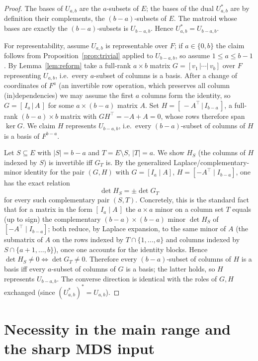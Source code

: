\documentclass{amsart}
\theoremstyle{definition}
\begin{document}
\begin{proof}
The bases of $U_{a,b}$ are the $a$-subsets of $E$; the bases of the dual
$U_{a,b}^{*}$ are by definition their complements, the $(b-a)$-subsets of $E$.
The matroid whose bases are exactly the $(b-a)$-subsets is $U_{b-a,b}$. Hence
$U_{a,b}^{*}=U_{b-a,b}$.

For representability, assume $U_{a,b}$ is representable over $F$; if $a\in\{0,b\}$
the claim follows from Proposition~\ref{prop:trivial} applied to $U_{b-a,b}$, so
assume $1\le a\le b-1$. By Lemma~\ref{lem:reform} take a full-rank $a\times b$
matrix $G=[v_1\,|\cdots|\,v_b]$ over $F$ representing $U_{a,b}$, i.e.\ every
$a$-subset of columns is a basis. After a change of coordinates of $F^a$
(an invertible row operation, which preserves all column (in)dependencies) we may
assume the first $a$ columns form the identity, so $G=[\,I_a\,|\,A\,]$ for some
$a\times(b-a)$ matrix $A$. Set $H=[\,-A^{\top}\,|\,I_{b-a}\,]$, a full-rank
$(b-a)\times b$ matrix with $GH^{\top}=-A+A=0$, whose rows therefore span
$\ker G$. We claim $H$ represents $U_{b-a,b}$, i.e.\ every $(b-a)$-subset of
columns of $H$ is a basis of $F^{b-a}$.

Let $S\subseteq E$ with $|S|=b-a$ and $T=E\setminus S$, $|T|=a$. We show
$H_S$ (the columns of $H$ indexed by $S$) is invertible iff $G_T$ is. By the
generalized Laplace/complementary-minor identity for the pair $(G,H)$ with
$G=[I_a\mid A]$, $H=[-A^\top\mid I_{b-a}]$, one has the exact relation
\[
\det H_S=\pm\det G_T
\]
for every such complementary pair $(S,T)$. Concretely, this is the standard fact
that for a matrix in the form $[\,I_a\mid A\,]$ the $a\times a$ minor on a column
set $T$ equals (up to sign) the complementary $(b-a)\times(b-a)$ minor
$\det H_S$ of $[-A^\top\mid I_{b-a}]$; both reduce, by Laplace expansion, to the
same minor of $A$ (the submatrix of $A$ on the rows indexed by $T\cap\{1,\dots,a\}$
and columns indexed by $S\cap\{a+1,\dots,b\}$), once one accounts for the identity
blocks. Hence $\det H_S\ne0\iff\det G_T\ne0$. Therefore every $(b-a)$-subset of
columns of $H$ is a basis iff every $a$-subset of columns of $G$ is a basis; the
latter holds, so $H$ represents $U_{b-a,b}$. The converse direction is identical
with the roles of $G,H$ exchanged (since $(U_{a,b}^{*})^{*}=U_{a,b}$).
\end{proof}

\section{Necessity in the main range and the sharp MDS input}
\end{document}
